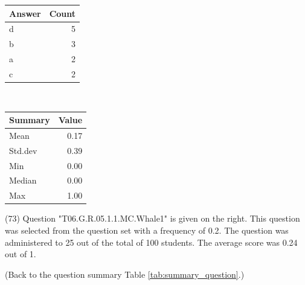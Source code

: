 \documentclass[12pt,nohyper]{tufte-handout}\usepackage[]{graphicx}\usepackage[]{color}
\begin{document}
\begin{center}%
\begin{tabular}{lr}
  \hline
Answer & Count \\ 
  \hline
d &   5 \\ 
  b &   3 \\ 
  a &   2 \\ 
  c &   2 \\ 
   \hline
\end{tabular}
~~~~~~~~%
\begin{tabular}{lr}
  \hline
Summary & Value \\ 
  \hline
Mean & 0.17 \\ 
  Std.dev & 0.39 \\ 
  Min & 0.00 \\ 
  Median & 0.00 \\ 
  Max & 1.00 \\ 
   \hline
\end{tabular}
\end{center}\newpage{} (73) Question "T06.G.R.05.1.1.MC.Whale1" is given on the right. This question was selected from the question set with a frequency of 0.2. The question was administered to 25 out of the total of 100 students. The average score was 0.24 out of 1.

 (Back to the question summary Table \ref{tab:summary_question}.)
\end{document}

